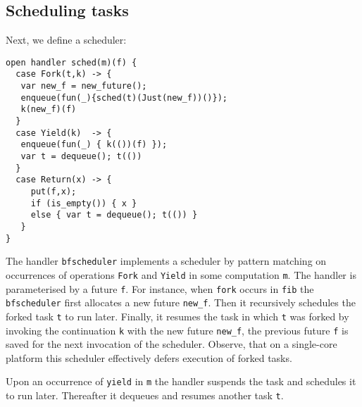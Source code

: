 \documentclass[preprint,10pt,numbers]{sigplanconf}
\begin{document}
\subsection{Scheduling tasks}\label{sec:sched}
Next, we define a scheduler:
\begin{lstlisting}[style={links},caption={}]
open handler sched(m)(f) {
  case Fork(t,k) -> {
   var new_f = new_future();
   enqueue(fun(_){sched(t)(Just(new_f))()});
   k(new_f)(f)
  }
  case Yield(k)  -> { 
   enqueue(fun(_) { k(())(f) }); 
   var t = dequeue(); t(()) 
  }
  case Return(x) -> {
     put(f,x);
     if (is_empty()) { x }
     else { var t = dequeue(); t(()) }
   } 
}
\end{lstlisting}
The handler \texttt{bfscheduler} implements a scheduler by pattern matching on occurrences of operations \texttt{Fork} and \texttt{Yield} in some computation \texttt{m}. The handler is parameterised by a future \texttt{f}. For instance, when \texttt{fork} occurs in \texttt{fib} the \texttt{bfscheduler} first allocates a new future \texttt{new\_f}. Then it recursively schedules the forked task \texttt{t} to run later. Finally, it resumes the task in which \texttt{t} was forked by invoking the continuation \texttt{k} with the new future \texttt{new\_f}, the previous future \texttt{f} is saved for the next invocation of the scheduler. Observe, that on a single-core platform this scheduler effectively defers execution of forked tasks.

Upon an occurrence of \texttt{yield} in \texttt{m} the handler suspends the task and schedules it to run later. Thereafter it dequeues and resumes another task \texttt{t}.
\end{document}
